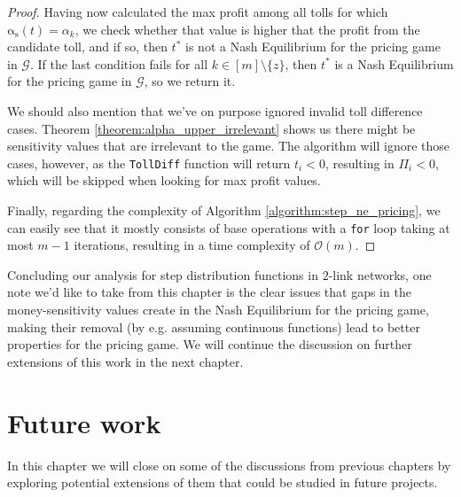 \documentclass[10pt,a4paper]{book}
\newcommand{\as}{\mathrm{\alpha_s}}
\newcommand{\Gm}{\mathcal{G}}
\theoremstyle{definition}
\theoremstyle{comment}
\begin{document}
\begin{proof}
	Having now calculated the max profit among all tolls for which $\as(t) = \alpha_k$, we check whether that value is higher that the profit from the candidate toll, and if so, then $t^*$ is not a Nash Equilibrium for the pricing game in $\Gm$.
	If the last condition fails for all $k \in [m] \setminus \{z\}$, then $t^*$ is a Nash Equilibrium for the pricing game in $\Gm$, so we return it.

	We should also mention that we've on purpose ignored invalid toll difference cases.
	Theorem \ref{theorem:alpha_upper_irrelevant} shows us there might be sensitivity values that are irrelevant to the game.
	The algorithm will ignore those cases, however, as the \texttt{TollDiff} function will return $t_i < 0$, resulting in $\Pi_i < 0$, which will be skipped when looking for max profit values.

	Finally, regarding the complexity of Algorithm \ref{algorithm:step_ne_pricing}, we can easily see that it mostly consists of base operations with a \texttt{for} loop taking at most $m - 1$ iterations, resulting in a time complexity of $\mathcal{O}(m)$.
\end{proof}

Concluding our analysis for step distribution functions in $2$-link networks, one note we'd like to take from this chapter is the clear issues that gaps in the money-sensitivity values create in the Nash Equilibrium for the pricing game, making their removal (by e.g. assuming continuous functions) lead to better properties for the pricing game.
We will continue the discussion on further extensions of this work in the next chapter.

\cleardoublepage


\chapter{Future work}
\label{chapter:future_work}

In this chapter we will close on some of the discussions from previous chapters by exploring potential extensions of them that could be studied in future projects.

\end{document}
